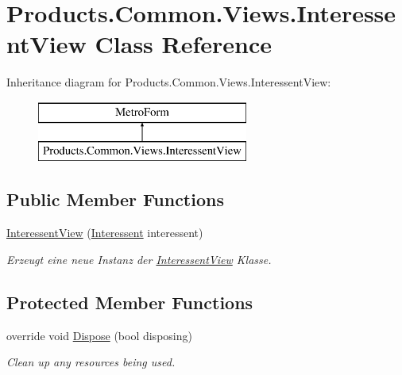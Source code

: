 \hypertarget{class_products_1_1_common_1_1_views_1_1_interessent_view}{}\section{Products.\+Common.\+Views.\+Interessent\+View Class Reference}
\label{class_products_1_1_common_1_1_views_1_1_interessent_view}
Inheritance diagram for Products.\+Common.\+Views.\+Interessent\+View\+:\begin{figure}[H]
\begin{center}
\leavevmode
\includegraphics[height=2.000000cm]{class_products_1_1_common_1_1_views_1_1_interessent_view}
\end{center}
\end{figure}
\subsection*{Public Member Functions}
\begin{DoxyCompactItemize}
\item 
\hyperlink{class_products_1_1_common_1_1_views_1_1_interessent_view_a14c58c8b85a2a133b1521ebf57568379}{Interessent\+View} (\hyperlink{class_products_1_1_model_1_1_entities_1_1_interessent}{Interessent} interessent)
\begin{DoxyCompactList}\small\item\em Erzeugt eine neue Instanz der \hyperlink{class_products_1_1_common_1_1_views_1_1_interessent_view}{Interessent\+View} Klasse. \end{DoxyCompactList}\end{DoxyCompactItemize}
\subsection*{Protected Member Functions}
\begin{DoxyCompactItemize}
\item 
override void \hyperlink{class_products_1_1_common_1_1_views_1_1_interessent_view_acda802d74482fc5a1980bb8c7e2b7be3}{Dispose} (bool disposing)
\begin{DoxyCompactList}\small\item\em Clean up any resources being used. \end{DoxyCompactList}\end{DoxyCompactItemize}


